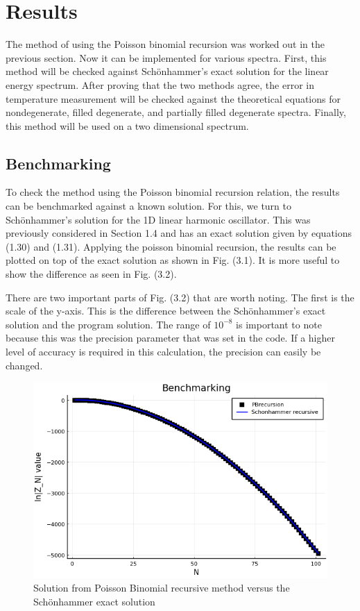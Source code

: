 \chapter{Results}\label{ch:cfd}
\begin{em}
The method of using the Poisson binomial recursion was worked out in the previous section. Now it can be implemented for various spectra. First, this method will be checked against Sch\"onhammer's exact solution for the linear energy spectrum. After proving that the two methods agree, the error in temperature measurement will be checked against the theoretical equations for nondegenerate, filled degenerate, and partially filled degenerate spectra. Finally, this method will be used on a two dimensional spectrum. 
\end{em}

\section{Benchmarking}
To check the method using the Poisson binomial recursion relation, the results can be benchmarked against a known solution. For this, we turn to Sch\"onhammer's solution for the 1D linear harmonic oscillator. This was previously considered in Section 1.4 and has an exact solution given by equations (1.30) and (1.31). Applying the poisson binomial recursion, the results can be plotted on top of the exact solution as shown in Fig. (3.1). It is more useful to show the difference as seen in Fig. (3.2). 

There are two important parts of Fig. (3.2) that are worth noting. The first is the scale of the y-axis. This is the difference between the Sch\"onhammer's exact solution and the program solution. The range of $10^{-8}$ is important to note because this was the precision parameter that was set in the code. If a higher level of accuracy is required in this calculation, the precision can easily be changed.  

\begin{figure}[H]
    \includegraphics[scale=0.75]{figures/pdf/Benchmarking.png}
    \caption{Solution from Poisson Binomial recursive method versus the Sch\"onhammer exact solution}
\end{figure}


